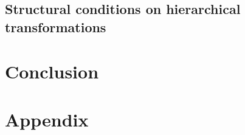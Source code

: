 \documentclass[aps,twocolumn]{revtex4-1}
\begin{document}
\subsection{Structural conditions on hierarchical transformations}

\section{Conclusion}

\appendix
\section{Appendix}


 

\end{document}
